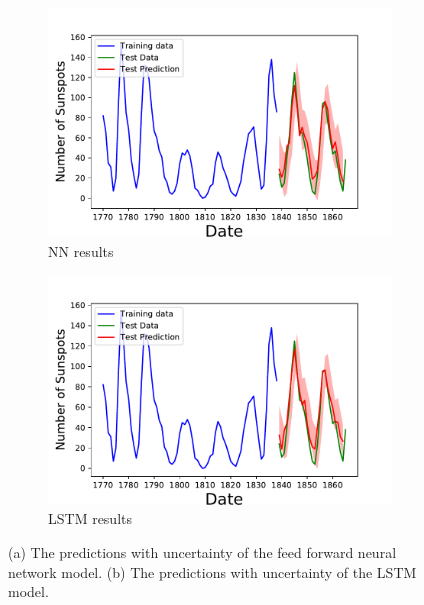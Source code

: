 \documentclass[10pt,a4paper]{article}
\begin{document}
\newpage
\begin{figure}[h]
\centering
\begin{subfigure}{.5\textwidth}
  \centering
  \includegraphics[scale=0.41]{Sunspot_Forecast_NN.pdf}
  \caption{NN results}
  \label{fig:NN results sunspots}
\end{subfigure}%
\begin{subfigure}{.5\textwidth}
  \centering
  \includegraphics[scale=0.41]{Sunspot_Forecast_LSTN.pdf}
  \caption{LSTM results}
  \label{fig:LSTM results sunspots}
\end{subfigure}
\caption{(a) The predictions with uncertainty of the feed forward neural network model. (b) The predictions with uncertainty of the LSTM model.}
\label{fig:results sunspots}
\end{figure}
\end{document}
